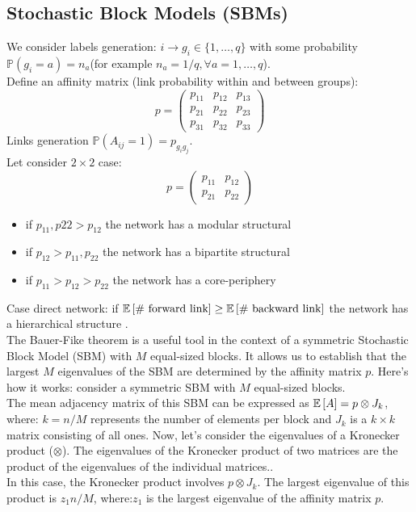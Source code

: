 \subsection{Stochastic Block Models (SBMs)}
We consider labels generation: $ i \to g_i \in \{1,\ldots,q\}$ with some probability $\mathbb{P}(g_i = a) = n_a$(for example $n_a = 1/q, \forall a = 1,\ldots,q$).\\
Define an affinity matrix (link probability within and between groups):
\[
p =
\begin{pmatrix}
	p_{11} & p_{12} & p_{13}\\
	p_{21} & p_{22} & p_{23}\\
	p_{31} & p_{32} & p_{33}
\end{pmatrix}
\]
Links generation $\mathbb{P}(A_{ij} =1) = p_{g_ig_j}$.\\
Let consider $2 \times 2$ case:
\[
p =\begin{pmatrix}
	p_{11} & p_{12}\\
	p_{21} & p_{22}
\end{pmatrix}
\]
\begin{itemize}
	\item if $p_{11},p{22}>p_{12}$ the network has a modular structural
	\item if $p_{12} > p_{11},p_{22}$ the network has a bipartite structural
	\item if $p_{11}>p_{12}>p_{22}$ the network has a core-periphery 
\end{itemize}
Case direct network: if $\mathbb{E}\left[\text{\# forward link}\right] \geq \mathbb{E}\left[\text{\# backward link}\right]$ the network has a hierarchical structure .\\
The Bauer-Fike theorem is a useful tool in the context of a symmetric Stochastic Block Model (SBM) with $M$ equal-sized blocks. It allows us to establish that the largest $M$ eigenvalues of the SBM are determined by the affinity matrix $p$. Here's how it works: consider a symmetric SBM with $M$ equal-sized blocks.\\
The mean adjacency matrix of this SBM can be expressed as $\mathbb{E}\left[A\right] = p \otimes J_k$, where: $k = n/M$ represents the number of elements per block and $J_k$ is a $k \times k$ matrix consisting of all ones.
Now, let's consider the eigenvalues of a Kronecker product ($\otimes$). The eigenvalues of the Kronecker product of two matrices are the product of the eigenvalues of the individual matrices..\\
In this case, the Kronecker product involves $p \otimes J_k$. The largest eigenvalue of this product is $z_1n/M$, where:$z_1$ is the largest eigenvalue of the affinity matrix $p$.\\
